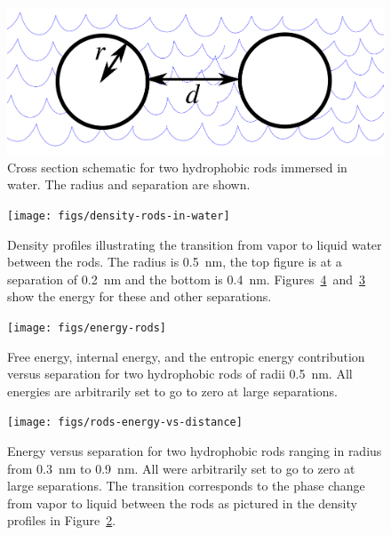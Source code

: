 \documentclass[letterpaper,twocolumn,amsmath,amssymb,prb]{revtex4-1}
\begin{document}
\begin{figure}
\begin{center}
\includegraphics[width=\columnwidth]{figs/rods-diagram}
\end{center}
\caption{ Cross section schematic for two hydrophobic rods immersed in water.
The radius and separation are shown.}
\label{fig:rods}
\end{figure}

\begin{figure}
\begin{center}
\texttt{[image: figs/density-rods-in-water]}
\end{center}
\caption{ Density profiles illustrating the transition from vapor 
to liquid water between the rods. The radius is 0.5~nm, the top figure is at a separation of 0.2~nm and the
bottom is 0.4~nm. Figures~\ref{fig:rods-energy-vs-distance}~and~\ref{fig:energy-rods} show
the energy for these and other separations.}
\label{fig:density-rods}
\end{figure}

\begin{figure}
\begin{center}
\texttt{[image: figs/energy-rods]}
\end{center}
\caption{ Free energy, internal energy, and the entropic energy contribution versus
separation for two hydrophobic rods of radii 0.5~nm. All energies are arbitrarily
set to go to zero at large separations. }
\label{fig:energy-rods}
\end{figure}

\begin{figure}
\begin{center}
\texttt{[image: figs/rods-energy-vs-distance]}
\end{center}
\caption{ Energy versus separation for two hydrophobic rods ranging in radius from
0.3~nm to 0.9~nm. All were arbitrarily set to go to zero at large separations. The
transition corresponds to the phase change from
vapor to liquid between the rods as pictured in the density profiles in 
Figure~\ref{fig:density-rods}. }
\label{fig:rods-energy-vs-distance}
\end{figure}
\end{document}
